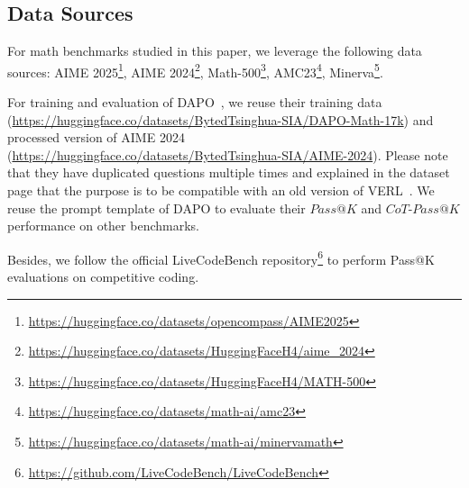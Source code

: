 \subsection{Data Sources}
\label{supp_sec:data_source}

For math benchmarks studied in this paper, we leverage the following data sources:
AIME 2025\footnote{\url{https://huggingface.co/datasets/opencompass/AIME2025}},
AIME 2024\footnote{\url{https://huggingface.co/datasets/HuggingFaceH4/aime_2024}},
Math-500\footnote{\url{https://huggingface.co/datasets/HuggingFaceH4/MATH-500}},
AMC23\footnote{\url{https://huggingface.co/datasets/math-ai/amc23}},
Minerva\footnote{\url{https://huggingface.co/datasets/math-ai/minervamath}}.

For training and evaluation of DAPO~\citep{yu2025DAPO-Zero}, we reuse their training data (\url{https://huggingface.co/datasets/BytedTsinghua-SIA/DAPO-Math-17k}) and processed version of AIME 2024 (\url{https://huggingface.co/datasets/BytedTsinghua-SIA/AIME-2024}).
Please note that they have duplicated questions multiple times and explained in the dataset page that the purpose is to be compatible with an old version of VERL~\citep{sheng2025VERL}.
We reuse the prompt template of DAPO to evaluate their $Pass@K$ and $CoT$-$Pass@K$ performance on other benchmarks.

Besides, we follow the official LiveCodeBench repository\footnote{\url{https://github.com/LiveCodeBench/LiveCodeBench}} to perform Pass@K evaluations on competitive coding.
